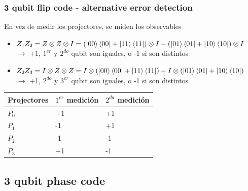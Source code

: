 \documentclass[10pt]{beamer}
\theoremstyle{remark}
\theoremstyle{definition}
\begin{document}
\begin{frame}[allowframebreaks]
    \frametitle{3 qubit flip code - alternative error detection}

    En vez de medir los projectores, se miden los observables
    \begin{itemize}
        \item $Z_1 Z_2 = Z \otimes Z \otimes I = (\ket{00}\bra{00}+\ket{11}\bra{11}) \otimes I - (\ket{01}\bra{01}+\ket{10}\bra{10}) \otimes I$ \\
        \hspace{0.7cm} $\rightarrow$ +1, $1^{er}$ y $2^{do}$ qubit son iguales, o -1 si son distintos
        \item $Z_2 Z_3 = I \otimes Z \otimes Z = I \otimes (\ket{00}\bra{00}+\ket{11}\bra{11}) - I \otimes (\ket{01}\bra{01}+\ket{10}\bra{10})$ \\
        \hspace{0.7cm} $\rightarrow$ +1, $2^{do}$ y $3^{er}$ qubit son iguales, o -1 si son distintos
    \end{itemize}

    \begin{center}
        \begin{tabular}{ | l | l | l | }
            \hline
            Projectores & $1^{er}$ medición & $2^{da}$ medición \\ 
            \hline
            $P_0$ & +1 & +1 \\
            $P_1$ & -1 & +1 \\
            $P_2$ & -1 & -1 \\
            $P_3$ & +1 & -1 \\
            \hline
       \end{tabular}
    \end{center}

\end{frame}

\subsection{3 qubit phase code}
\end{document}
